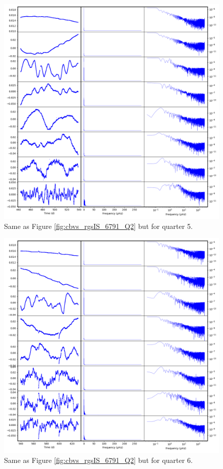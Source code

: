 \begin{figure}
    \centering
    \includegraphics[width=\linewidth]{Chapter_Appended/AppB/cbv_6791_rgs_q05.png}
    \caption{Same as Figure \ref{fig:cbvs_rgsIS_6791_Q2} but for quarter 5.}
    \label{fig:cbvs_rgsIS_6791_Q05}
\end{figure}


\begin{figure}
    \centering
    \includegraphics[width=\linewidth]{Chapter_Appended/AppB/cbv_6791_rgs_q06.png}
    \caption{Same as Figure \ref{fig:cbvs_rgsIS_6791_Q2} but for quarter 6.}
    \label{fig:cbvs_rgsIS_6791_Q06}
\end{figure}


